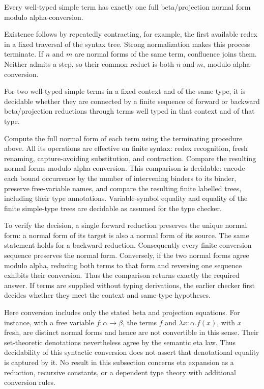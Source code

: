 \begin{corollary}
Every well-typed simple term has exactly one full beta/projection normal
form modulo alpha-conversion.
\end{corollary}
\Proof
Existence follows by repeatedly contracting, for example, the first
available redex in a fixed traversal of the syntax tree. Strong
normalization makes this process terminate. If $n$ and $m$ are normal
forms of the same term, confluence joins them. Neither admits a step,
so their common reduct is both $n$ and $m$, modulo alpha-conversion.
\Done

\begin{theorem}
For two well-typed simple terms in a fixed context and of the same type,
it is decidable whether they are connected by a finite sequence of
forward or backward beta/projection reductions through terms well typed
in that context and of that type.
\end{theorem}
\Proof
Compute the full normal form of each term using the terminating
procedure above. All its operations are effective on finite syntax:
redex recognition, fresh renaming, capture-avoiding substitution, and
contraction. Compare the resulting normal forms modulo alpha-conversion.
This comparison is decidable: encode each bound occurrence by the
number of intervening binders to its binder, preserve free-variable
names, and compare the resulting finite labelled trees, including their
type annotations. Variable-symbol equality and equality of the finite
simple-type trees are decidable as assumed for the type checker.

To verify the decision, a single forward reduction preserves the unique
normal form: a normal form of its target is also a normal form of its
source. The same statement holds for a backward reduction. Consequently
every finite conversion sequence preserves the normal form. Conversely,
if the two normal forms agree modulo alpha, reducing both terms to that
form and reversing one sequence exhibits their conversion. Thus the
comparison returns exactly the required answer. If terms are supplied
without typing derivations, the earlier checker first decides whether
they meet the context and same-type hypotheses.
\Done

Here conversion includes only the stated beta and projection equations.
For instance, with a free variable $f:\alpha\to\beta$, the terms $f$ and
$\lambda x:\alpha.f(x)$, with $x$ fresh, are distinct normal forms and
hence are not convertible in this sense. Their set-theoretic denotations
nevertheless agree by the semantic eta law. Thus decidability of this
syntactic conversion does not assert that denotational equality is
captured by it. No result in this subsection concerns eta expansion as
a reduction, recursive constants, or a dependent type theory with
additional conversion rules.

